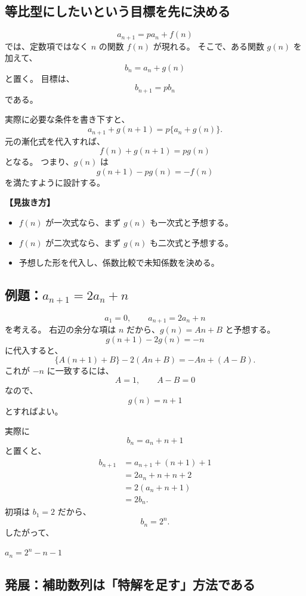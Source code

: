 \subsection{等比型にしたいという目標を先に決める}

\[
  a_{n+1}=pa_n+f(n)
\]
では、定数項ではなく $n$ の関数 $f(n)$ が現れる。
そこで、ある関数 $g(n)$ を加えて、
\[
  b_n=a_n+g(n)
\]
と置く。
目標は、
\[
  b_{n+1}=pb_n
\]
である。

実際に必要な条件を書き下すと、
\[
  a_{n+1}+g(n+1)=p\{a_n+g(n)\}.
\]
元の漸化式を代入すれば、
\[
  f(n)+g(n+1)=pg(n)
\]
となる。
つまり、$g(n)$ は
\[
  g(n+1)-pg(n)=-f(n)
\]
を満たすように設計する。

\noindent\textbf{【見抜き方】}

\begin{itemize}
  \item $f(n)$ が一次式なら、まず $g(n)$ も一次式と予想する。
  \item $f(n)$ が二次式なら、まず $g(n)$ も二次式と予想する。
  \item 予想した形を代入し、係数比較で未知係数を決める。
\end{itemize}

\subsection{例題：$a_{n+1}=2a_n+n$}

\[
  a_1=0,\qquad a_{n+1}=2a_n+n
\]
を考える。
右辺の余分な項は $n$ だから、$g(n)=An+B$ と予想する。
\[
  g(n+1)-2g(n)=-n
\]
に代入すると、
\[
  \{A(n+1)+B\}-2(An+B)
  =-An+(A-B).
\]
これが $-n$ に一致するには、
\[
  A=1,\qquad A-B=0
\]
なので、
\[
  g(n)=n+1
\]
とすればよい。

実際に
\[
  b_n=a_n+n+1
\]
と置くと、
\[
  \begin{aligned}
    b_{n+1}
     & =a_{n+1}+(n+1)+1 \\
     & =2a_n+n+n+2      \\
     & =2(a_n+n+1)      \\
     & =2b_n.
  \end{aligned}
\]
初項は $b_1=2$ だから、
\[
  b_n=2^n.
\]
したがって、
\begin{mdquote}
  $a_n=2^n-n-1$
\end{mdquote}

\subsection{発展：補助数列は「特解を足す」方法である}

